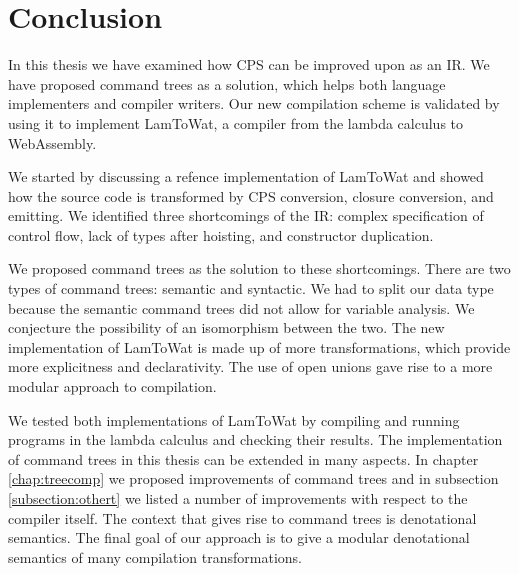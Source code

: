 \chapter{\label{chap:conclusion}Conclusion}

In this thesis we have examined how CPS can be improved upon as an IR. We have proposed command trees as a solution, which helps both language implementers and compiler writers. Our new compilation scheme is validated by using it to implement LamToWat, a compiler from the lambda calculus to WebAssembly. 

We started by discussing a refence implementation of LamToWat and showed how the source code is transformed by CPS conversion, closure conversion, and emitting. We identified three shortcomings of the IR: complex specification of control flow, lack of types after hoisting, and constructor duplication.

We proposed command trees as the solution to these shortcomings. There are two types of command trees: semantic and syntactic. We had to split our data type because the semantic command trees did not allow for variable analysis. We conjecture the possibility of an isomorphism between the two. The new implementation of LamToWat is made up of more transformations, which provide more explicitness and declarativity. The use of open unions gave rise to a more modular approach to compilation.

We tested both implementations of LamToWat by compiling and running programs in the lambda calculus and checking their results. The implementation of command trees in this thesis can be extended in many aspects. In chapter \ref{chap:treecomp} we proposed improvements of command trees and in subsection \ref{subsection:othert} we listed a number of improvements with respect to the compiler itself. The context that gives rise to command trees is denotational semantics. The final goal of our approach is to give a modular denotational semantics of many compilation transformations.